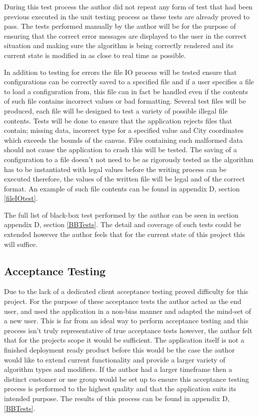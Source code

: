 During this test process the author did not repeat any form of test that had been previous executed in the unit testing process as these tests are already proved to pass. The tests performed manually by the author will be for the purpose of ensuring that the correct error messages are displayed to the user in the correct situation and making sure the algorithm is being correctly rendered and its current state is modified in as close to real time as possible. 

In addition to testing for errors the file IO process will be tested ensure that configurations can be correctly saved to a specified file and if a user specifies a file to load a configuration from, this file can in fact be handled even if the contents of such file contains incorrect values or bad formatting. Several test files will be produced, each file will be designed to test a variety of possible illegal file contents. Tests will be done to ensure that the application rejects files that contain; missing data, incorrect type for a specified value and City coordinates which exceeds the bounds of the canvas. Files containing such malformed data should not cause the application to crash this will be tested. The saving of a configuration to a file doesn’t not need to be as rigorously tested as the algorithm has to be instantiated with legal values before the writing process can be executed therefore, the values of the written file will be legal and of the correct format. An example of such file contents can be found in appendix D, section \ref{fileIOtest}.

The full list of black-box test performed by the author can be seen in section appendix D, section \ref{BBTests}. The detail and coverage of such tests could be extended however the author feels that for the current state of this project this will suffice.

\subsection{Acceptance Testing}

Due to the lack of a dedicated client acceptance testing proved difficulty for this project. For the purpose of these acceptance tests the author acted as the end user, and used the application in a non-bias manner and adapted the mind-set of a new user. This is far from an ideal way to perform acceptance testing and this process isn’t truly representative of true acceptance tests however, the author felt that for the projects scope it would be sufficient. The application itself is not a finished deployment ready product before this would be the case the author would like to extend current functionality and provide a larger variety of algorithm types and modifiers. If the author had a larger timeframe then a distinct customer or use group would be set up to ensure this acceptance testing process is performed to the highest quality and that the application suits its intended purpose. The results of this process can be found in appendix D, \ref{BBTests}.
